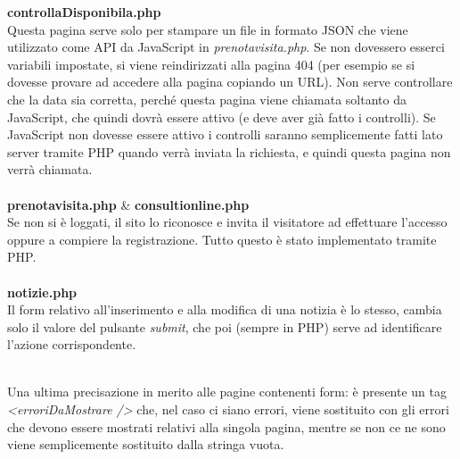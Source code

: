 \textbf{controllaDisponibila.php} \\
Questa pagina serve solo per stampare un file in formato JSON che viene utilizzato come API da JavaScript in \textit{prenotavisita.php}. Se non dovessero esserci variabili impostate, si viene reindirizzati alla pagina 404 (per esempio se si dovesse provare ad accedere alla pagina copiando un URL).
Non serve controllare che la data sia corretta, perché questa pagina viene chiamata soltanto da JavaScript, che quindi dovrà essere attivo (e deve aver già fatto i controlli).
Se JavaScript non dovesse essere attivo i controlli saranno semplicemente fatti lato server tramite PHP quando verrà inviata la richiesta, e quindi questa pagina non verrà chiamata. \\ \\

\textbf{prenotavisita.php} \& \textbf{consultionline.php} \\
Se non si è loggati, il sito lo riconosce e invita il visitatore ad effettuare l'accesso oppure a compiere la registrazione. Tutto questo è stato implementato tramite PHP. \\ \\

\textbf{notizie.php} \\
Il form relativo all'inserimento e alla modifica di una notizia è lo stesso, cambia solo il valore del pulsante \textit{submit}, che poi (sempre in PHP) serve ad identificare l'azione corrispondente. \\ \\

\bigskip
\bigskip

Una ultima precisazione in merito alle pagine contenenti form: è presente un tag \textit{<erroriDaMostrare />} che, nel caso ci siano errori, viene sostituito con gli errori che devono essere mostrati  relativi alla singola pagina, mentre se non ce ne sono viene semplicemente sostituito dalla stringa vuota.







